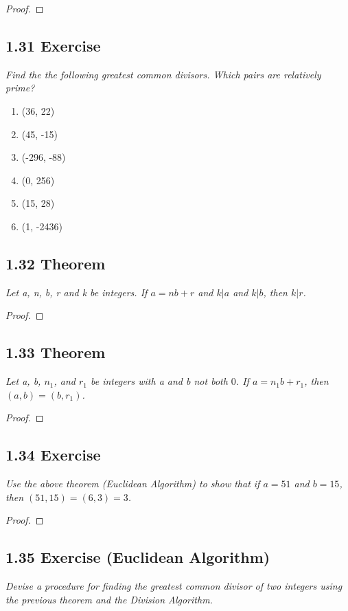 \documentclass{article}
\begin{document}
\begin{proof}
\end{proof}

\subsection*{1.31 Exercise} 
\quad \textit{Find the the following greatest common divisors. Which pairs are relatively prime?}

\begin{enumerate}
    \item (36, 22)
    \item (45, -15)
    \item (-296, -88)
    \item (0, 256)
    \item (15, 28)
    \item (1, -2436)
\end{enumerate}

\subsection*{1.32 Theorem} 
\quad \textit{Let a, n, b, r and k be integers. If $a = nb +r$ and $k \vert a$ and $k \vert b$, then $k \vert r$.}

\begin{proof}
\end{proof}

\subsection*{1.33 Theorem} 
\quad \textit{Let a, b, $n_1$, and $r_1$ be integers with a and b not both $0$. If $a = n_{1}b+r_1$, then $(a,b)=(b,r_1)$.}

\begin{proof}
\end{proof}

\subsection*{1.34 Exercise} 
\quad \textit{Use the above theorem (Euclidean Algorithm) to show that if $a=51$ and $b=15$, then $(51, 15)=(6,3)=3$.}

\begin{proof}
\end{proof}

\subsection*{1.35 Exercise (Euclidean Algorithm)} 
\quad \textit{Devise a procedure for finding the greatest common divisor of two integers using the previous theorem and the Division Algorithm.}
\end{document}
